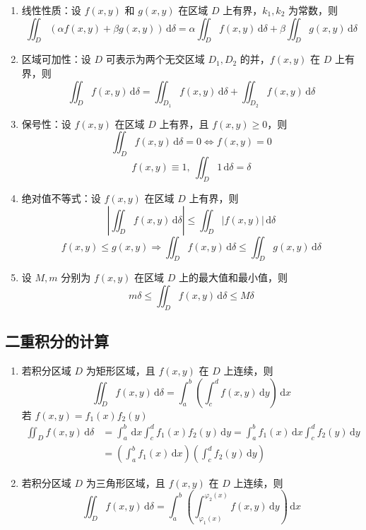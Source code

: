\begin{enumerate}
    \item 线性性质：设 $f(x,y)$ 和 $g(x,y)$ 在区域 $D$ 上有界，$k_{1},k_{2}$ 为常数，则
          \[
              \iint_{D} (\alpha f(x,y) + \beta g(x,y)) \, \mathrm{d}\delta = \alpha \iint_{D} f(x,y) \, \mathrm{d}\delta + \beta \iint_{D} g(x,y) \, \mathrm{d}\delta
          \]
    \item 区域可加性：设 $D$ 可表示为两个无交区域 $D_{1},D_{2}$ 的并，$f(x,y)$ 在 $D$ 上有界，则
          \[
              \iint_{D} f(x,y) \, \mathrm{d}\delta = \iint_{D_{1}} f(x,y) \, \mathrm{d}\delta + \iint_{D_{2}} f(x,y) \, \mathrm{d}\delta
          \]
    \item 保号性：设 $f(x,y)$ 在区域 $D$ 上有界，且 $f(x,y) \geq 0$，则
          \[
              \iint_{D} f(x,y) \, \mathrm{d}\delta = 0 \iff f(x,y) = 0
          \]
          \[
              f(x,y)\equiv1,\ \iint_{D} 1 \, \mathrm{d}\delta = \delta
          \]
    \item 绝对值不等式：设 $f(x,y)$ 在区域 $D$ 上有界，则
          \[
              \left| \iint_{D} f(x,y) \, \mathrm{d}\delta \right| \leq \iint_{D} |f(x,y)| \, \mathrm{d}\delta
          \]
          \[
              f(x,y)\le g(x,y)\Rightarrow \iint_{D}f(x,y) \, \mathrm{d}\delta\le\iint_{D}g(x,y) \, \mathrm{d}\delta
          \]
    \item 设 $M,m$ 分别为 $f(x,y)$ 在区域 $D$ 上的最大值和最小值，则
          \[
              m\delta\le\iint_{D}f(x,y) \, \mathrm{d}\delta\le M\delta
          \]

\end{enumerate}

\subsection{二重积分的计算}

\begin{enumerate}
    \item 若积分区域 $D$ 为矩形区域，且 $f(x,y)$ 在 $D$ 上连续，则
          \[
              \iint_{D} f(x,y) \, \mathrm{d}\delta = \int_{a}^{b} \left( \int_{c}^{d} f(x,y) \, \mathrm{d}y \right) \, \mathrm{d}x
          \]
          若 $f(x,y) = f_1(x)f_2(y)$
          \[\begin{aligned}
                  \iint_{D} f(x,y) \, \mathrm{d}\delta & = \int_{a}^{b} \, \mathrm{d}x \int_{c}^{d} f_1(x)f_2(y) \, \mathrm{d}y = \int_{a}^{b} f_1(x) \, \mathrm{d}x \int_{c}^{d} f_2(y) \, \mathrm{d}y \\
                                                       & = \left( \int_{a}^{b} f_1(x) \, \mathrm{d}x \right) \left( \int_{c}^{d} f_2(y) \, \mathrm{d}y \right)
              \end{aligned}\]
    \item 若积分区域 $D$ 为三角形区域，且 $f(x,y)$ 在 $D$ 上连续，则
          \[
              \iint_{D} f(x,y) \, \mathrm{d}\delta = \int_{a}^{b} \left( \int_{\varphi_{1}(x)}^{\varphi_{2}(x)} f(x,y) \, \mathrm{d}y \right) \, \mathrm{d}x
          \]
\end{enumerate}

